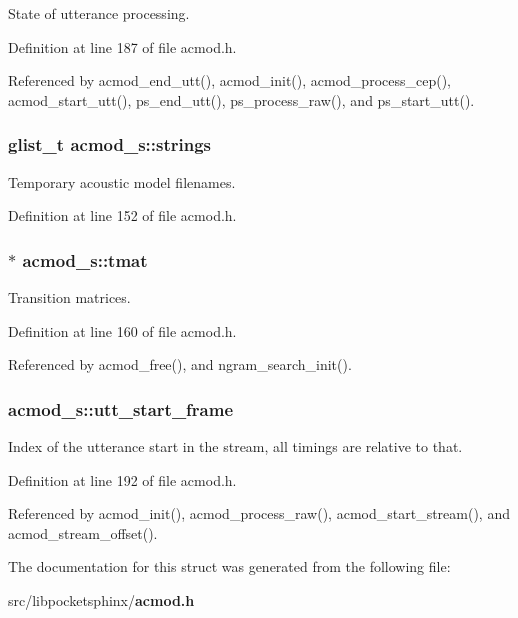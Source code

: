 State of utterance processing. 



Definition at line 187 of file acmod.\+h.



Referenced by acmod\+\_\+end\+\_\+utt(), acmod\+\_\+init(), acmod\+\_\+process\+\_\+cep(), acmod\+\_\+start\+\_\+utt(), ps\+\_\+end\+\_\+utt(), ps\+\_\+process\+\_\+raw(), and ps\+\_\+start\+\_\+utt().

\subsubsection[{strings}]{\setlength{\rightskip}{0pt plus 5cm}glist\+\_\+t acmod\+\_\+s\+::strings}\label{structacmod__s_a9f6b699a0fbd43cf7ababab6f0ab81be}


Temporary acoustic model filenames. 



Definition at line 152 of file acmod.\+h.

\subsubsection[{tmat}]{$\ast$ acmod\+\_\+s\+::tmat}\label{structacmod__s_aaa3982184a49f0d61e397ba89f486259}


Transition matrices. 



Definition at line 160 of file acmod.\+h.



Referenced by acmod\+\_\+free(), and ngram\+\_\+search\+\_\+init().

\subsubsection[{utt\+\_\+start\+\_\+frame}]{ acmod\+\_\+s\+::utt\+\_\+start\+\_\+frame}\label{structacmod__s_aecf7cf72f18a8ecb1cc8e96928bc1ad4}


Index of the utterance start in the stream, all timings are relative to that. 



Definition at line 192 of file acmod.\+h.



Referenced by acmod\+\_\+init(), acmod\+\_\+process\+\_\+raw(), acmod\+\_\+start\+\_\+stream(), and acmod\+\_\+stream\+\_\+offset().



The documentation for this struct was generated from the following file\+:\begin{DoxyCompactItemize}
\item 
src/libpocketsphinx/{\bf acmod.\+h}\end{DoxyCompactItemize}
